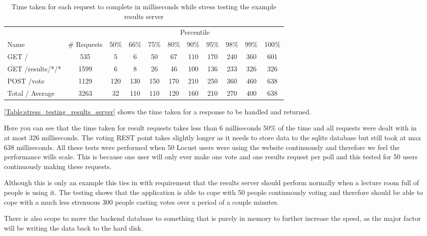 \begin{table}
\caption{Time taken for each request to complete in milliseconds while stress testing the example results server}
\begin{tabular}{l c  c c c c c c c c c }
\hline 
& & \multicolumn{9}{c}{Percentile} \\
Name & \# Requests & 50\% & 66\% & 75\% & 80\% & 90\% & 95\% & 98\% & 99\% & 100\% \\ 
\hline 
GET / & 535 & 5 & 6 & 50 & 67 & 110 & 170 & 240 & 360 & 601 \\ 
\hline 
GET /results/*/* & 1599 & 6 & 8 & 26 & 46 & 100 & 136 & 233 & 326 & 326 \\ 
\hline 
POST /vote & 1129 & 120 & 130 & 150 & 170 & 210 & 250 & 360 & 460 & 638 \\ 
\hline 
Total / Average & 3263 & 32 & 110 & 110 & 120 & 160 & 210 & 270 & 400 & 638 \\ 
\hline 
\end{tabular}
\label{Table:stress_testing_results_server}
\end{table}

\autoref{Table:stress_testing_results_server} shows the time taken for a response to be handled and returned.

Here you can see that the time taken for result requests takes less than 6 milliseconds 50\% of the time and all requests were dealt with in at most 326 milliseconds. The voting REST point takes slightly longer as it needs to store data to the sqlite database but still took at max 638 milliseconds. All these tests were performed when 50 Locust users were using the website continuously and therefore we feel the performance wills scale. This is because one user will only ever make one vote and one results request per poll and this tested for 50 users continuously making these requests.

Although this is only an example this ties in with requirement  that the results server should perform normally when a lecture room full of people is using it. The testing shows that the application is able to cope with 50 people continuously voting and therefore should be able to cope with a much less strenuous 300 people casting votes over a period of a couple minutes.

There is also scope to move the backend database to something that is purely in memory to further increase the speed, as the major factor will be writing the data back to the hard disk.

